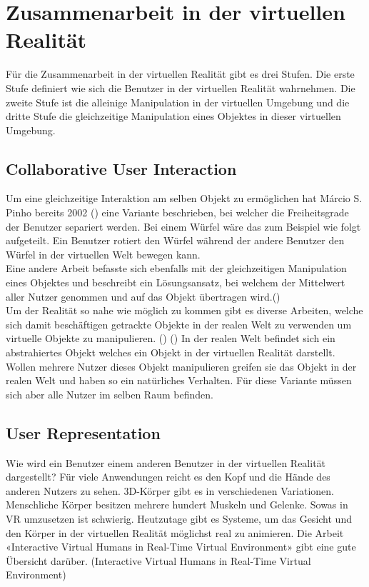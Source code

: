 \section{Zusammenarbeit in der virtuellen Realität}
Für die Zusammenarbeit in der virtuellen Realität gibt es drei Stufen. Die erste Stufe definiert wie sich die Benutzer in der virtuellen Realität wahrnehmen. Die zweite Stufe ist die alleinige Manipulation in der virtuellen Umgebung und die dritte Stufe die gleichzeitige Manipulation eines Objektes in dieser virtuellen Umgebung. 


\subsection{Collaborative User Interaction}
Um eine gleichzeitige Interaktion am selben Objekt zu ermöglichen hat Márcio S. Pinho bereits 2002 (\cite{pinho_cooperative_2002}) eine Variante beschrieben, bei welcher die Freiheitsgrade der Benutzer separiert werden. Bei einem Würfel wäre das zum Beispiel wie folgt aufgeteilt. Ein Benutzer rotiert den Würfel während der andere Benutzer den Würfel in der virtuellen Welt bewegen kann. \\
 
\noindent Eine andere Arbeit befasste sich ebenfalls mit der gleichzeitigen Manipulation eines Objektes und beschreibt ein Lösungsansatz, bei welchem der Mittelwert aller Nutzer genommen und auf das Objekt übertragen wird.(\cite{ruddle_symmetric_2002}) \\
 
\noindent Um der Realität so nahe wie möglich zu kommen gibt es diverse Arbeiten, welche sich damit beschäftigen getrackte Objekte in der realen Welt zu verwenden um virtuelle Objekte zu manipulieren. (\cite{he_physhare:_2017}) (\cite{podkosova_immersivedeck:_2016}) In der realen Welt befindet sich ein abstrahiertes Objekt welches ein Objekt in der virtuellen Realität darstellt. Wollen mehrere Nutzer dieses Objekt manipulieren greifen sie das Objekt in der realen Welt und haben so ein natürliches Verhalten. Für diese Variante müssen sich aber alle Nutzer im selben Raum befinden.
 
\subsection{User Representation}

Wie wird ein Benutzer einem anderen Benutzer in der virtuellen Realität dargestellt? 
Für viele Anwendungen reicht es den Kopf und die Hände des anderen Nutzers zu sehen.
3D-Körper gibt es in verschiedenen Variationen. Menschliche Körper besitzen mehrere hundert Muskeln und Gelenke. Sowas in VR umzusetzen ist schwierig.
Heutzutage gibt es Systeme, um das Gesicht und den Körper in der virtuellen Realität möglichst real zu animieren. Die Arbeit «Interactive Virtual Humans in Real-Time Virtual Environment» gibt eine gute Übersicht darüber. (Interactive Virtual Humans in Real-Time Virtual Environment)


